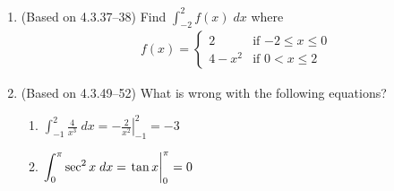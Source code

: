 \documentclass{article}
\newcommand{\ds}{\displaystyle}
\begin{document}
\begin{enumerate}
\item (Based on 4.3.37--38) %
  Find $\ds \int_{-2}^2 f(x) \; dx$
  where
  \begin{align*}
    f(x) = \begin{cases}
      2     & \mbox{if $-2\le x\le 0$} \\
      4-x^2 & \mbox{if $0< x \le 2$}
    \end{cases}
  \end{align*}
\item (Based on 4.3.49--52) %
  What is wrong with the following equations?
  \begin{multicols}{2}
  \begin{enumerate}
  \item $\ds \int_{-1}^2 \frac{4}{x^3} \; dx 
    = \left.-\frac{2}{x^2}\right|_{-1}^2 = -3$
  \item $\ds \int_0^\pi \sec^2 x \; dx 
    = \left.\tan x\vphantom{\frac{4}{x^3}}\right|_0^\pi = 0$
  \end{enumerate}
  \end{multicols}

\end{enumerate}
\end{document}
